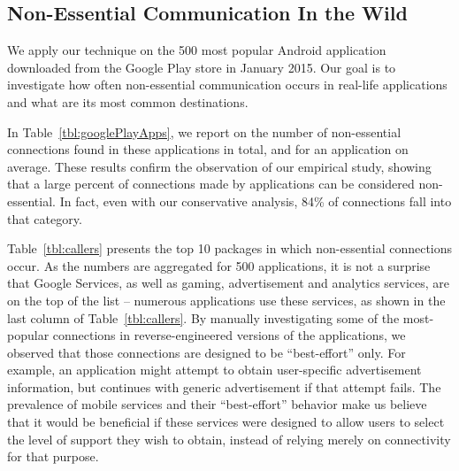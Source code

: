 \subsection{Non-Essential Communication In the Wild}

We apply our technique on the 500 most popular Android application
downloaded from the Google Play store in January 2015.  Our goal is to
investigate how often non-essential communication occurs in real-life
applications and what are its most common destinations.

In Table~\ref{tbl:googlePlayApps}, we report on the number of
non-essential connections found in these applications in total, and
for an application on average.  These results confirm the observation
of our empirical study, showing that a large percent of connections
made by applications can be considered non-essential.  In fact, even
with our conservative analysis, 84\% of connections fall into that
category.

Table~\ref{tbl:callers} presents the top 10 packages in which
non-essential connections occur.  As the numbers are aggregated for
500 applications, it is not a surprise that Google Services, as well
as gaming, advertisement and analytics services, are on the top of the
list -- numerous applications use these services, as shown in the last
column of Table~\ref{tbl:callers}.  By manually investigating some of
the most-popular connections in reverse-engineered versions of the
applications, we observed that those connections are designed to be
``best-effort'' only. For example, an application might attempt to
obtain user-specific advertisement information, but continues with
generic advertisement if that attempt fails.  The prevalence of mobile
services and their ``best-effort'' behavior make us believe that it
would be beneficial if these services were designed to allow users to
select the level of support they wish to obtain, instead of relying
merely on connectivity for that purpose.

 






